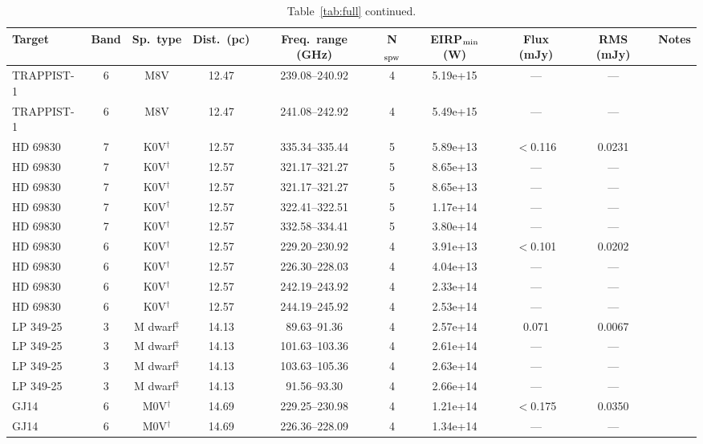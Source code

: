 \documentclass{openjournal}
\begin{document}
\begin{table}
\centering
\scriptsize
\caption{Table~\ref{tab:full} continued.}
\label{tab:full4}
\begin{tabularx}{\textwidth}{@{}l c c c c c c c c X@{}}
\hline
Target & Band & Sp.\ type & Dist.\ (pc) & Freq.\ range (GHz) & N$_{\rm spw}$ & EIRP$_{\rm min}$ (W) & Flux (mJy) & RMS (mJy) & Notes \\
\hline
TRAPPIST-1 & 6 & M8V & 12.47 & 239.08--240.92 & 4 & 5.19e+15 & --- & --- &  \\
TRAPPIST-1 & 6 & M8V & 12.47 & 241.08--242.92 & 4 & 5.49e+15 & --- & --- &  \\
HD 69830 & 7 & K0V$^\dagger$ & 12.57 & 335.34--335.44 & 5 & 5.89e+13 & $<$0.116 & 0.0231 &  \\
HD 69830 & 7 & K0V$^\dagger$ & 12.57 & 321.17--321.27 & 5 & 8.65e+13 & --- & --- &  \\
HD 69830 & 7 & K0V$^\dagger$ & 12.57 & 321.17--321.27 & 5 & 8.65e+13 & --- & --- &  \\
HD 69830 & 7 & K0V$^\dagger$ & 12.57 & 322.41--322.51 & 5 & 1.17e+14 & --- & --- &  \\
HD 69830 & 7 & K0V$^\dagger$ & 12.57 & 332.58--334.41 & 5 & 3.80e+14 & --- & --- &  \\
HD 69830 & 6 & K0V$^\dagger$ & 12.57 & 229.20--230.92 & 4 & 3.91e+13 & $<$0.101 & 0.0202 &  \\
HD 69830 & 6 & K0V$^\dagger$ & 12.57 & 226.30--228.03 & 4 & 4.04e+13 & --- & --- &  \\
HD 69830 & 6 & K0V$^\dagger$ & 12.57 & 242.19--243.92 & 4 & 2.33e+14 & --- & --- &  \\
HD 69830 & 6 & K0V$^\dagger$ & 12.57 & 244.19--245.92 & 4 & 2.53e+14 & --- & --- &  \\
LP  349-25 & 3 & M dwarf$^\ddagger$ & 14.13 & 89.63--91.36 & 4 & 2.57e+14 & 0.071 & 0.0067 &  \\
LP  349-25 & 3 & M dwarf$^\ddagger$ & 14.13 & 101.63--103.36 & 4 & 2.61e+14 & --- & --- &  \\
LP  349-25 & 3 & M dwarf$^\ddagger$ & 14.13 & 103.63--105.36 & 4 & 2.63e+14 & --- & --- &  \\
LP  349-25 & 3 & M dwarf$^\ddagger$ & 14.13 & 91.56--93.30 & 4 & 2.66e+14 & --- & --- &  \\
GJ14 & 6 & M0V$^\dagger$ & 14.69 & 229.25--230.98 & 4 & 1.21e+14 & $<$0.175 & 0.0350 &  \\
GJ14 & 6 & M0V$^\dagger$ & 14.69 & 226.36--228.09 & 4 & 1.34e+14 & --- & --- &  \\

\end{tabularx}
\end{table}
\end{document}
